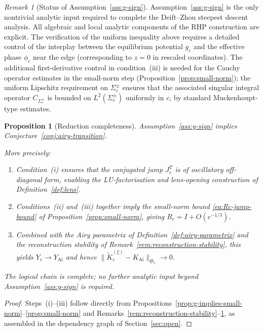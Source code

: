 \documentclass[12pt,a4paper]{amsart}
\newtheorem{proposition}[theorem]{Proposition}
\theoremstyle{definition}
\theoremstyle{remark}
\newtheorem{remark}[theorem]{Remark}
\begin{document}
\begin{remark}[Status of Assumption~\ref{ass:g-sign}]
\label{rem:g-open}
Assumption~\ref{ass:g-sign} is the only nontrivial analytic input
required to complete the Deift--Zhou steepest descent analysis.
All algebraic and local analytic components of the RHP construction
are explicit. The verification of the uniform inequality above
requires a detailed control of the interplay between the equilibrium
potential $g_c$ and the effective phase $\phi_c$ near the edge
(corresponding to $z=0$ in rescaled coordinates).
The additional first-derivative control in condition~(iii) is needed
for the Cauchy operator estimates in the small-norm step
(Proposition~\ref{prop:small-norm}); the uniform Lipschitz requirement
on $\Sigma_c^\pm$ ensures that the associated singular integral
operator $C_{\Sigma_c^\pm}$ is bounded on $L^2(\Sigma_c^\pm)$
uniformly in $c$, by standard Muckenhoupt-type estimates.
\end{remark}

\begin{proposition}[Reduction completeness]
\label{prop:reduction-completeness}
Assumption~\ref{ass:g-sign} implies
Conjecture~\ref{conj:airy-transition}.

More precisely:
\begin{enumerate}[label=(\roman*)]
\item Condition~(i) ensures that the conjugated jump $J_c^T$ is of
  oscillatory off-diagonal form, enabling the LU-factorisation and
  lens-opening construction of Definition~\ref{def:lens}.
\item Conditions~(ii) and~(iii) together imply the small-norm bound
  \eqref{eq:Rc-jump-bound} of Proposition~\ref{prop:small-norm},
  giving $R_c = I + O(c^{-1/3})$.
\item Combined with the Airy parametrix of Definition~\ref{def:airy-parametrix}
  and the reconstruction stability of Remark~\ref{rem:reconstruction-stability},
  this yields $Y_c \to Y_{\mathrm{Ai}}$ and hence
  $\|\widetilde{K}_c^{(\xi)} - K_{\mathrm{Ai}}\|_{\mathfrak{S}_1} \to 0$.
\end{enumerate}
The logical chain is complete; no further analytic input beyond
Assumption~\ref{ass:g-sign} is required.
\end{proposition}

\begin{proof}
Steps~(i)--(iii) follow directly from
Propositions~\ref{prop:g-implies-small-norm}--\ref{prop:small-norm}
and Remarks~\ref{rem:reconstruction-stability}--\ref{rem:g-open},
as assembled in the dependency graph of Section~\ref{sec:open}.
\end{proof}
\end{document}
